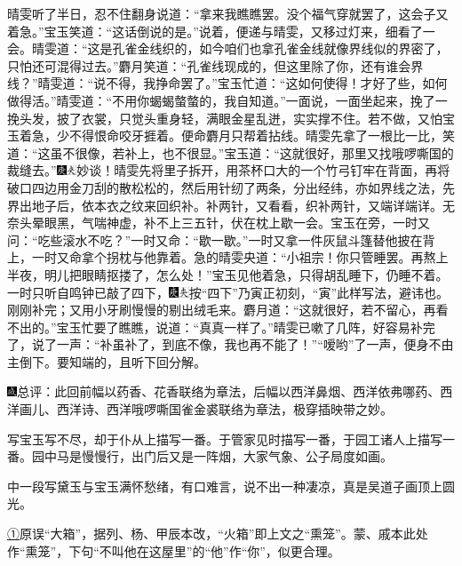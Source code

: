 晴雯听了半日，忍不住翻身说道：``拿来我瞧瞧罢。没个福气穿就罢了，这会子又着急。''宝玉笑道：``这话倒说的是。''说着，便递与晴雯，又移过灯来，细看了一会。晴雯道：``这是孔雀金线织的，如今咱们也拿孔雀金线就像界线似的界密了，只怕还可混得过去。''麝月笑道：``孔雀线现成的，但这里除了你，还有谁会界线？''晴雯道：``说不得，我挣命罢了。''宝玉忙道：``这如何使得！才好了些，如何做得活。''晴雯道：``不用你蝎蝎螫螫的，我自知道。''一面说，一面坐起来，挽了一挽头发，披了衣裳，只觉头重身轻，满眼金星乱迸，实实撑不住。若不做，又怕宝玉着急，少不得恨命咬牙捱着。便命麝月只帮着拈线。晴雯先拿了一根比一比，笑道：``这虽不很像，若补上，也不很显。''宝玉道：``这就很好，那里又找哦啰嘶国的裁缝去。''{\includegraphics[width=3mm]{../Images/00004}\includegraphics[width=3mm]{../Images/00012}\footnotesize \kaishu 妙谈！}晴雯先将里子拆开，用茶杯口大的一个竹弓钉牢在背面，再将破口四边用金刀刮的散松松的，然后用针纫了两条，分出经纬，亦如界线之法，先界出地子后，依本衣之纹来回织补。补两针，又看看，织补两针，又端详端详。无奈头晕眼黑，气喘神虚，补不上三五针，伏在枕上歇一会。宝玉在旁，一时又问：``吃些滚水不吃？''一时又命：``歇一歇。''一时又拿一件灰鼠斗篷替他披在背上，一时又命拿个拐枕与他靠着。急的晴雯央道：``小祖宗！你只管睡罢。再熬上半夜，明儿把眼睛抠搂了，怎么处！''宝玉见他着急，只得胡乱睡下，仍睡不着。一时只听自鸣钟已敲了四下，{\includegraphics[width=3mm]{../Images/00004}\includegraphics[width=3mm]{../Images/00012}\footnotesize \kaishu 按``四下''乃寅正初刻，``寅''此样写法，避讳也。}刚刚补完；又用小牙刷慢慢的剔出绒毛来。麝月道：``这就很好，若不留心，再看不出的。''宝玉忙要了瞧瞧，说道：``真真一样了。''晴雯已嗽了几阵，好容易补完了，说了一声：``补虽补了，到底不像，我也再不能了！''``嗳哟''了一声，便身不由主倒下。要知端的，且听下回分解。

{\includegraphics[width=3mm]{../Images/00005}总评：此回前幅以药香、花香联络为章法，后幅以西洋鼻烟、西洋依弗哪药、西洋画儿、西洋诗、西洋哦}啰{嘶国雀金裘联络为章法，极穿插映带之妙。}

{写宝玉写不尽，却于仆从上描写一番。于管家见时描写一番，于园工诸人上描写一番。园中马是慢慢行，出门后又是一阵烟，大家气象、公子局度如画。}

{中一段写黛玉与宝玉满怀愁绪，有口难言，说不出一种凄凉，真是吴道子画顶上圆光。}

{\href{../Text/part0056_split_000.html\#navto_1_a}{①}原误``大箱''，据列、杨、甲辰本改，``火箱''即上文之``熏笼''。蒙、戚本此处作``熏笼''，下句``不叫他在这屋里''的``他''作``你''，似更合理。}
